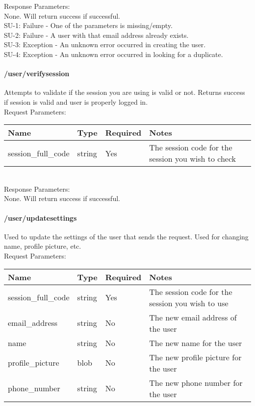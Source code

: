 \documentclass{article}[11pt]
\begin{document}
\noindent
Response Parameters: \\
None. Will return success if successful. \\

\ErrorsMysql
SU-1: Failure - One of the parameters is missing/empty. \\
SU-2: Failure - A user with that email address already exists. \\
SU-3: Exception - An unknown error occurred in creating the user. \\
SU-4: Exception - An unknown error occurred in looking for a duplicate.


\paragraph{/user/verifysession}\textbf{}

Attempts to validate if the session you are using is valid or not. Returns success if session is valid and user is properly logged in. \\

\noindent
Request Parameters:

\noindent
\begin{tabular}{|l|l|l|l|}
\hline
\textbf{Name} & \textbf{Type} & \textbf{Required} & \textbf{Notes} \\
\hline
session\_full\_code & string & Yes & The session code for the session you wish to check \\
\hline
\end{tabular} \\

\noindent
Response Parameters: \\
None. Will return success if successful. \\

\ErrorsSession


\paragraph{/user/updatesettings}\textbf{}

Used to update the settings of the user that sends the request. Used for changing name, profile picture, etc. \\

\noindent
Request Parameters:

\noindent
\begin{tabular}{|l|l|l|l|}
\hline
\textbf{Name} & \textbf{Type} & \textbf{Required} & \textbf{Notes} \\
\hline
session\_full\_code & string & Yes & The session code for the session you wish to use \\
email\_address & string & No & The new email address of the user \\
name & string & No & The new name for the user \\
profile\_picture & blob & No & The new profile picture for the user \\
phone\_number & string & No & The new phone number for the user \\
\hline
\end{tabular} \\
\end{document}
